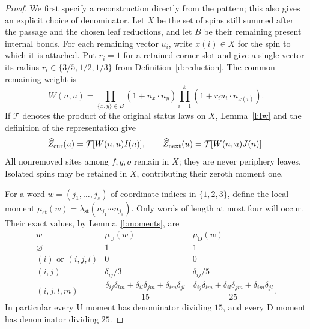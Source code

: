 \begin{proof}
We first specify a reconstruction directly from the pattern;
this also gives an explicit choice of denominator.  Let \(X\)
be the set of spins still summed after the passage and the
chosen leaf reductions, and let \(B\) be their remaining present
internal bonds.  For each remaining vector \(u_i\), write
\(x(i)\in X\) for the spin to which it is attached.  Put
\(r_i=1\) for a retained corner slot and give a single vector
its radius \(r_i\in\{3/5,1/2,1/3\}\) from
Definition~\ref{d:reduction}.  The common remaining weight is
\[
 W(n,u)=\prod_{\{x,y\}\in B}(1+n_x\cdot n_y)
                     \prod_{i=1}^k(1+r_i u_i\cdot n_{x(i)}).
\]
If \(\mathcal T\) denotes the product of the original status
laws on \(X\), Lemma~\ref{l:Iw} and the definition of the
representation give
\[
 \widehat Z_{\rm cur}(u)=\mathcal T[W(n,u)I(n)],\qquad
 \widehat Z_{\rm next}(u)=\mathcal T[W(n,u)J(n)].
\]
All nonremoved sites among \(f,g,o\) remain in \(X\); they are
never periphery leaves.  Isolated spins may be retained in
\(X\), contributing their zeroth moment one.

For a word \(w=(j_1,\ldots,j_s)\) of coordinate indices in
\(\{1,2,3\}\), define the local moment
\(\mu_{\mathrm{st}}(w)=\lambda_{\mathrm{st}}
(n_{j_1}\cdots n_{j_s})\).  Only words of length at most four
will occur.  Their exact values, by Lemma~\ref{l:moments}, are
\[
 \begin{array}{c|cc}
 w&\mu_{\mathrm U}(w)&\mu_{\mathrm D}(w)\\ \hline
 \varnothing&1&1\\
 (i)\text{ or }(i,j,l)&0&0\\
 (i,j)&\delta_{ij}/3&\delta_{ij}/5\\
 (i,j,l,m)&
 \dfrac{\delta_{ij}\delta_{lm}+\delta_{il}\delta_{jm}
                         +\delta_{im}\delta_{jl}}{15}&
 \dfrac{\delta_{ij}\delta_{lm}+\delta_{il}\delta_{jm}
                         +\delta_{im}\delta_{jl}}{25}.
 \end{array}
\]
In particular every \(\mathrm U\) moment has denominator dividing
\(15\), and every \(\mathrm D\) moment has denominator dividing
\(25\).


\end{proof}
